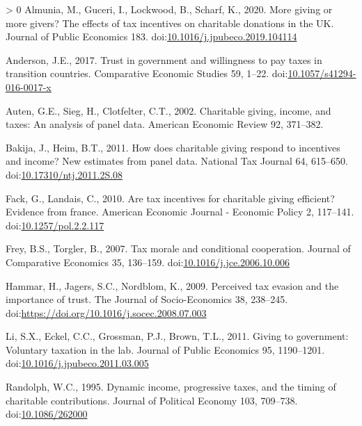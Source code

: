 \documentclass[ review  , 3p ]{elsarticle}
\newlength{\cslhangindent}
\newenvironment{CSLReferences}[3] %
 {%
  \setlength{\parindent}{0pt}
  \ifodd #1 \everypar{\setlength{\hangindent}{\cslhangindent}}\ignorespaces\fi
  \ifnum #2 > 0
  \setlength{\parskip}{#2\baselineskip}
  \fi
 }%
 {}
\begin{document}
  \hypertarget{refs}{}
  \begin{CSLReferences}{1}{0}
  \leavevmode\hypertarget{ref-Almunia2020}{}%
  Almunia, M., Guceri, I., Lockwood, B., Scharf, K., 2020. More giving or more givers? The effects of tax incentives on charitable donations in the UK. Journal of Public Economics 183. doi:\href{https://doi.org/10.1016/j.jpubeco.2019.104114}{10.1016/j.jpubeco.2019.104114}

  \leavevmode\hypertarget{ref-Anderson2017}{}%
  Anderson, J.E., 2017. Trust in government and willingness to pay taxes in transition countries. Comparative Economic Studies 59, 1--22. doi:\href{https://doi.org/10.1057/s41294-016-0017-x}{10.1057/s41294-016-0017-x}

  \leavevmode\hypertarget{ref-Auten2002}{}%
  Auten, G.E., Sieg, H., Clotfelter, C.T., 2002. Charitable giving, income, and taxes: An analysis of panel data. American Economic Review 92, 371--382.

  \leavevmode\hypertarget{ref-Bakija2011}{}%
  Bakija, J., Heim, B.T., 2011. How does charitable giving respond to incentives and income? New estimates from panel data. National Tax Journal 64, 615--650. doi:\href{https://doi.org/10.17310/ntj.2011.2S.08}{10.17310/ntj.2011.2S.08}

  \leavevmode\hypertarget{ref-Fack2010}{}%
  Fack, G., Landais, C., 2010. Are tax incentives for charitable giving efficient? Evidence from france. American Economic Journal - Economic Policy 2, 117--141. doi:\href{https://doi.org/10.1257/pol.2.2.117}{10.1257/pol.2.2.117}

  \leavevmode\hypertarget{ref-Frey2007}{}%
  Frey, B.S., Torgler, B., 2007. Tax morale and conditional cooperation. Journal of Comparative Economics 35, 136--159. doi:\href{https://doi.org/10.1016/j.jce.2006.10.006}{10.1016/j.jce.2006.10.006}

  \leavevmode\hypertarget{ref-Hammar2009}{}%
  Hammar, H., Jagers, S.C., Nordblom, K., 2009. Perceived tax evasion and the importance of trust. The Journal of Socio-Economics 38, 238--245. doi:\url{https://doi.org/10.1016/j.socec.2008.07.003}

  \leavevmode\hypertarget{ref-Li2011}{}%
  Li, S.X., Eckel, C.C., Grossman, P.J., Brown, T.L., 2011. Giving to government: Voluntary taxation in the lab. Journal of Public Economics 95, 1190--1201. doi:\href{https://doi.org/10.1016/j.jpubeco.2011.03.005}{10.1016/j.jpubeco.2011.03.005}

  \leavevmode\hypertarget{ref-Randolph1995}{}%
  Randolph, W.C., 1995. Dynamic income, progressive taxes, and the timing of charitable contributions. Journal of Political Economy 103, 709--738. doi:\href{https://doi.org/10.1086/262000}{10.1086/262000}


\end{CSLReferences}
\end{document}
